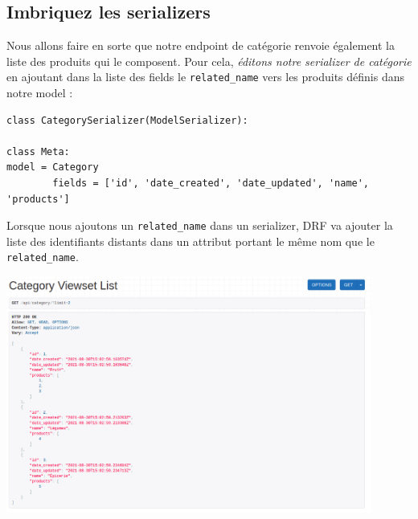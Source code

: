 \documentclass[a4paper]{article}
\begin{document}
\subsection{Imbriquez les serializers}
Nous allons faire en sorte que notre endpoint de catégorie renvoie également la liste des produits qui le composent. Pour cela, {\em éditons notre serializer de catégorie} en ajoutant dans la liste des fields le {\tt related\_name}  vers les produits définis dans notre model :
\begin{verbatim}
class CategorySerializer(ModelSerializer):
 
class Meta:
model = Category
        fields = ['id', 'date_created', 'date_updated', 'name', 'products']
\end{verbatim}
\begin{theorem}
Lorsque nous ajoutons un {\tt related\_name}  dans un serializer, DRF va ajouter la liste des identifiants distants dans un attribut portant le même nom que le {\tt related\_name}.
\end{theorem}

\begin{center}
\includegraphics[width=12cm]{images/image12.png}
\end{center}
\end{document}

